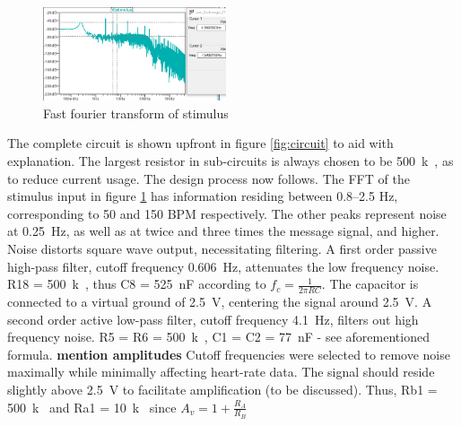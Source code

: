 \begin{figure}
	\vspace{-0.45cm}
    \centering
    \includegraphics[width = 0.48\textwidth]{./Figures/fft}
    \caption{Fast fourier transform of stimulus}
    \label{fig:fft}
\end{figure}
The complete circuit is shown upfront in figure \ref{fig:circuit} to aid with explanation. The largest resistor in sub-circuits is always chosen to be \SI{500}{k\Omega}, as to reduce current usage. The design process now follows. The FFT of the stimulus input in figure \ref{fig:fft} has information residing between \numrange{0.8}{2.5} \si{Hz}, corresponding to 50 and 150 BPM respectively. The other peaks represent noise at \SI{0.25}{Hz}, as well as at twice and three times the message signal, and higher. Noise distorts square wave output, necessitating filtering. A first order passive high-pass filter, cutoff frequency \SI{0.606}{Hz}, attenuates the low frequency noise. R18 = \SI{500}{k\Omega}, thus C8 = \SI{525}{nF} according to $f_{c} = \frac{1}{2\pi R C}$. The capacitor is connected to a virtual ground of \SI{2.5}{V}, centering the signal around \SI{2.5}{V}. A second order active low-pass filter, cutoff frequency \SI{4.1}{Hz}, filters out high frequency noise. R5 = R6 = \SI{500}{k\Omega}, C1 = C2 = \SI{77}{nF} - see aforementioned formula. \textbf{mention amplitudes} Cutoff frequencies were selected to remove noise maximally while minimally affecting heart-rate data. The signal should reside slightly above \SI{2.5}{V} to facilitate amplification (to be discussed). Thus, Rb1 = \SI{500}{k\Omega} and Ra1 = \SI{10}{k\Omega} since $A_v=1+\frac{R_{A}}{R_{B}}$ 
